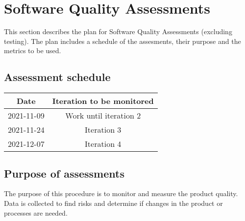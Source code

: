 \section{Software Quality Assessments}
This section describes the plan for Software Quality Assessments (excluding testing). The plan includes a schedule of the assesments, their purpose and the metrics to be used.



\subsection{Assessment schedule}
\begin{table}[H]
\centering
\begin{tabular}{||c c||} 
\hline
Date & Iteration to be monitored \\ [0.5ex] 
\hline\hline
2021-11-09 & Work until iteration 2 \\
\hline
2021-11-24 & Iteration 3 \\
\hline
2021-12-07 & Iteration 4 \\
\hline
\end{tabular}
\end{table}

\subsection{Purpose of assessments}
The purpose of this procedure is to monitor and measure the product quality. Data is collected to find risks and determine if changes in the product or processes are needed.

